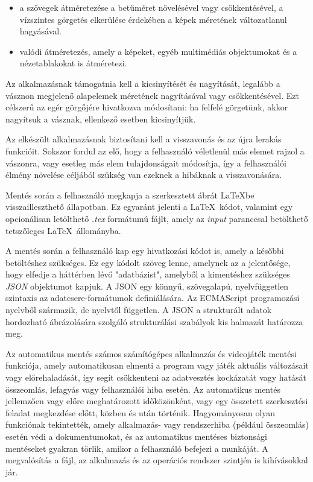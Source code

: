 \begin{itemize}
	\item a szövegek átméretezése a betűméret növelésével vagy csökkentésével, a vízszintes görgetés elkerülése érdekében a képek méretének változatlanul hagyásával.
	\item valódi átméretezés, amely a képeket, egyéb multimédiás objektumokat és a nézetablakokat is átméretezi.
\end{itemize}

Az alkalmazásnak támogatnia kell a kicsinyítését és nagyítását, legalább a vásznon megjelenő alapelemek méretének nagyításával vagy csökkentésével. Ezt célszerű az egér görgőjére hivatkozva módosítani: ha felfelé görgetünk, akkor nagyítsuk a vásznak, ellenkező esetben kicsinyítjük.


Az elkészült alkalmazásnak biztosítani kell a visszavonás és az újra lerakás funkcióit. Sokszor fordul az elő, hogy a felhasználó véletlenül más elemet rajzol a vászonra, vagy esetleg más elem tulajdonságait módosítja, így a felhasználói élmény növelése céljából szükség van ezeknek a hibáknak a visszavonására.



Mentés során a felhasználó megkapja a szerkesztett ábrát \LaTeX\-be visszailleszthető állapotban. Ez egyaránt jelenti a \LaTeX\ kódot, valamint egy opcionálisan letölthető \textit{.tex} formátumú fájlt, amely az \textit{input} paranccsal betölthető tetszőleges \LaTeX\ állományba.

A mentés során a felhasználó kap egy hivatkozási kódot is, amely a későbbi betöltéshez szükséges. Ez egy kódolt szöveg lenne, amelynek az a jelentősége, hogy elfedje a háttérben lévő "adatbázist", amelyből a kimentéshez szükséges \textit{JSON}\cite{json} objektumot kapjuk. A JSON egy könnyű, szövegalapú, nyelvfüggetlen szintaxis az adatcsere-formátumok definiálására. Az ECMAScript\cite{ecmascript} programozási nyelvből származik, de nyelvtől független. A JSON a strukturált adatok hordozható ábrázolására szolgáló strukturálási szabályok kis halmazát határozza meg.


Az automatikus mentés számos számítógépes alkalmazás és videojáték mentési funkciója, amely automatikusan elmenti a program vagy játék aktuális változásait vagy előrehaladását, így segít csökkenteni az adatvesztés kockázatát vagy hatását összeomlás, lefagyás vagy felhasználói hiba esetén. Az automatikus mentés jellemzően vagy előre meghatározott időközönként, vagy egy összetett szerkesztési feladat megkezdése előtt, közben és után történik. Hagyományosan olyan funkciónak tekintették, amely alkalmazás- vagy rendszerhiba (például összeomlás) esetén védi a dokumentumokat, és az automatikus mentéses biztonsági mentéseket gyakran törlik, amikor a felhasználó befejezi a munkáját. A megvalósítás a fájl, az alkalmazás és az operációs rendszer szintjén is kihívásokkal jár.

